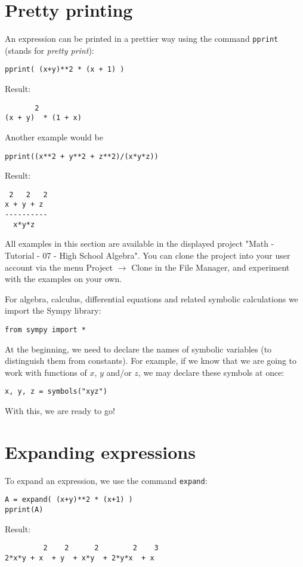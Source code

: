 \documentclass[article,A4,12pt]{llncs}
\begin{document}
\section{Pretty printing}
An expression can be printed in a prettier way using the command {\tt pprint} (stands for {\em pretty print}):
\begin{verbatim}
pprint( (x+y)**2 * (x + 1) )
\end{verbatim}
Result:
\begin{verbatim}
       2
(x + y)  * (1 + x)
\end{verbatim}
Another example would be
\begin{verbatim}
pprint((x**2 + y**2 + z**2)/(x*y*z))
\end{verbatim}
Result:
\begin{verbatim}
 2   2   2
x + y + z
----------
  x*y*z   
\end{verbatim}
All examples in this section are available in the displayed project 
"Math - Tutorial - 07 - High School Algebra". You can clone the project into 
your user account via the menu Project $\rightarrow$ Clone in the File 
Manager, and experiment with the examples on your own.

For algebra, calculus, differential equations and related symbolic calculations 
we import the Sympy library:

\begin{verbatim}
from sympy import *
\end{verbatim}
At the beginning, we need to declare the names of symbolic variables (to distinguish 
them from constants). For example, if we know that we are going to work with functions 
of $x$, $y$ and/or $z$, we may declare these symbols at once:
\begin{verbatim}
x, y, z = symbols("xyz")
\end{verbatim}
With this, we are ready to go!

\section{Expanding expressions}

To expand an expression, we use the command {\tt expand}:
\begin{verbatim}
A = expand( (x+y)**2 * (x+1) )
pprint(A)
\end{verbatim}
Result:
\begin{verbatim}
         2    2      2        2    3
2*x*y + x  + y  + x*y  + 2*y*x  + x 
\end{verbatim}
\end{document}
